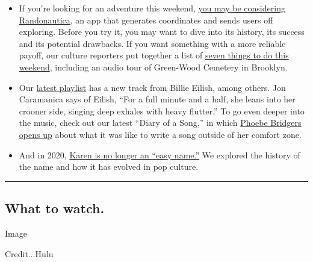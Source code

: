 \begin{itemize}
\item
  If you're looking for an adventure this weekend,
  \href{https://www.nytimes.com/2020/07/31/style/randonautica-app.html}{you
  may be considering Randonautica}, an app that generates coordinates
  and sends users off exploring. Before you try it, you may want to dive
  into its history, its success and its potential drawbacks. If you want
  something with a more reliable payoff, our culture reporters put
  together a list of
  \href{https://www.nytimes.com/2020/07/30/arts/things-to-do-weekend-coronavirus.html}{seven
  things to do this weekend}, including an audio tour of Green-Wood
  Cemetery in Brooklyn.
\item
  Our
  \href{https://www.nytimes.com/2020/07/31/arts/music/playlist-billie-eilish-snakehips-a-boogie.html}{latest
  playlist} has a new track from Billie Eilish, among others. Jon
  Caramanica says of Eilish, ``For a full minute and a half, she leans
  into her crooner side, singing deep exhales with heavy flutter.'' To
  go even deeper into the music, check out our latest ``Diary of a
  Song,'' in which
  \href{https://www.nytimes.com/2020/07/30/arts/music/phoebe-bridgers-kyoto.html}{Phoebe
  Bridgers opens up} about what it was like to write a song outside of
  her comfort zone.
\item
  And in 2020,
  \href{https://www.nytimes.com/2020/07/31/style/karen-name-meme-history.html}{Karen
  is no longer an ``easy name.''} We explored the history of the name
  and how it has evolved in pop culture.
\end{itemize}

\begin{center}\rule{0.5\linewidth}{\linethickness}\end{center}

\hypertarget{what-to-watch}{%
\subsection{What to watch.}\label{what-to-watch}}

Image

Credit...Hulu

